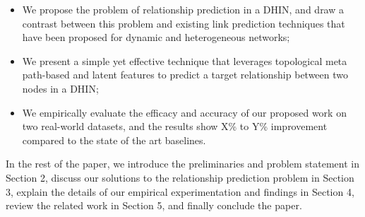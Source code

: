 \begin{itemize}

\item We propose the problem of relationship prediction in a DHIN, and draw a contrast between this problem and existing link prediction techniques that have been proposed for dynamic and heterogeneous networks;

\item We present a simple yet effective technique that leverages topological meta path-based and latent features to predict a target relationship between two nodes in a DHIN;



\item We empirically evaluate the efficacy and accuracy of our proposed work on two real-world datasets, and the results show X\% to Y\% improvement compared to the state of the art baselines.

\end{itemize}


In the rest of the paper, we introduce the preliminaries and problem statement in Section 2, discuss our solutions to the relationship prediction problem in Section 3, explain the details of our empirical experimentation and findings in Section 4, review the related work in Section 5, and finally conclude the paper.
